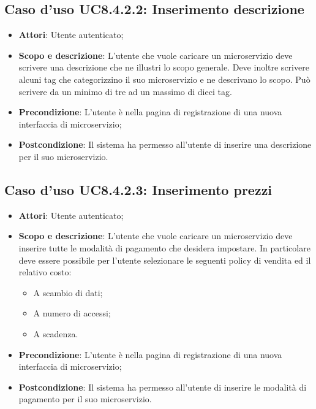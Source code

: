 \documentclass[12pt,a4paper,titlepage]{article}
\begin{document}
	\subsection{Caso d'uso UC8.4.2.2: Inserimento descrizione}
	\label{UC8.4.2.2}
	\begin{itemize}
		\item \textbf{Attori}: Utente autenticato;
		\item \textbf{Scopo e descrizione}: L'utente che vuole caricare un microservizio deve scrivere una descrizione che ne illustri lo scopo generale. Deve inoltre scrivere alcuni tag che categorizzino il suo microservizio e ne descrivano lo scopo. Può scrivere da un minimo di tre ad un massimo di dieci tag.
		\item \textbf{Precondizione}: L'utente è nella pagina di registrazione di una nuova interfaccia di microservizio;
		\item \textbf{Postcondizione}: Il sistema ha permesso all'utente di inserire una descrizione per il suo microservizio.
	\end{itemize}
	\subsection{Caso d'uso UC8.4.2.3: Inserimento prezzi}
	\label{UC8.4.2.3}
	\begin{itemize}
		\item \textbf{Attori}: Utente autenticato;
		\item \textbf{Scopo e descrizione}: L'utente che vuole caricare un microservizio deve inserire tutte le modalità di pagamento che desidera impostare. In particolare deve essere possibile per l'utente selezionare le seguenti policy di vendita ed il relativo costo:
		\begin{itemize}
			\item A scambio di dati;
			\item A numero di accessi;
			\item A scadenza.
		\end{itemize} 
		\item \textbf{Precondizione}: L'utente è nella pagina di registrazione di una nuova interfaccia di microservizio;
		\item \textbf{Postcondizione}: Il sistema ha permesso all'utente di inserire le modalità di pagamento per il suo microservizio.
	\end{itemize}
\end{document}
